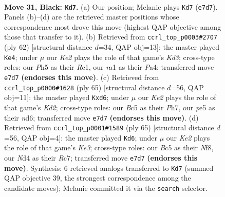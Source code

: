 \documentclass[11pt]{article}
\begin{document}
\clearpage

\begin{figure}[p]\centering
\begin{subfigure}{0.46\textwidth}\centering
\resizebox{\linewidth}{!}{%
\newchessgame
\chessboard[
  setfen={r7/4k3/b1p1p2N/P1b1P2p/3n1P1P/1p2B3/7K/RN6 b - - 8 31},
  showmover=false,
  pgfstyle=straightmove, color=movearrow, markmove={e7-d7}
]}
\caption{}
\end{subfigure}\hfill
\begin{subfigure}{0.46\textwidth}\centering
\resizebox{\linewidth}{!}{%
\newchessgame
\chessboard[
  setfen={4r1k1/1p4b1/p3p3/3nN1p1/P2B2P1/1P1K4/5P2/2R5 w - - 5 32},
  showmover=false,
  pgfstyle=straightmove, color=movearrow, markmove={d3-e4}
]}
\caption{}
\end{subfigure}
\\[4pt]
\begin{subfigure}{0.46\textwidth}\centering
\resizebox{\linewidth}{!}{%
\newchessgame
\chessboard[
  setfen={8/3k2Bp/p1pN4/1p2n1P1/7r/1P3b2/P1P5/2K1R3 b - - 0 33},
  showmover=false,
  pgfstyle=straightmove, color=movearrow, markmove={d7-d6}
]}
\caption{}
\end{subfigure}\hfill
\begin{subfigure}{0.46\textwidth}\centering
\resizebox{\linewidth}{!}{%
\newchessgame
\chessboard[
  setfen={5n2/1pr3b1/p3k1pp/8/P7/4RN1P/1P1B2P1/1K6 b - - 11 33},
  showmover=false,
  pgfstyle=straightmove, color=movearrow, markmove={e6-d6}
]}
\caption{}
\end{subfigure}
\caption{\textbf{Move 31, Black: \texttt{Kd7}.} (a) Our position; Melanie plays \texttt{Kd7} (\texttt{e7d7}). Panels (b)--(d) are the retrieved master positions whose correspondence most drove this move (highest QAP objective among those that transfer to it). (b) Retrieved from \texttt{ccrl\_top\_p0003\#2707} (ply 62) [structural distance $d$=34, QAP obj=13]: the master played \texttt{Ke4}; under $\mu$ our \emph{Ke2} plays the role of that game's \emph{Kd3}; cross-type roles: our \emph{P}h5 as their \emph{R}c1, our \emph{r}a1 as their \emph{P}a4; transferred move \texttt{e7d7} \textbf{(endorses this move)}. (c) Retrieved from \texttt{ccrl\_top\_p0000\#1628} (ply 65) [structural distance $d$=56, QAP obj=11]: the master played \texttt{Kxd6}; under $\mu$ our \emph{Ke2} plays the role of that game's \emph{Kd2}; cross-type roles: our \emph{B}c5 as their \emph{P}h7, our \emph{p}e5 as their \emph{n}d6; transferred move \texttt{e7d7} \textbf{(endorses this move)}. (d) Retrieved from \texttt{ccrl\_top\_p0001\#1589} (ply 65) [structural distance $d$=56, QAP obj=4]: the master played \texttt{Kd6}; under $\mu$ our \emph{Ke2} plays the role of that game's \emph{Ke3}; cross-type roles: our \emph{B}c5 as their \emph{N}f8, our \emph{N}d4 as their \emph{R}c7; transferred move \texttt{e7d7} \textbf{(endorses this move)}. Synthesis: 6 retrieved analogs transferred to \texttt{Kd7} (summed QAP objective 39, the strongest correspondence among the candidate moves); Melanie committed it via the \texttt{search} selector.}
\label{fig:thought-m61}
\end{figure}
\end{document}
